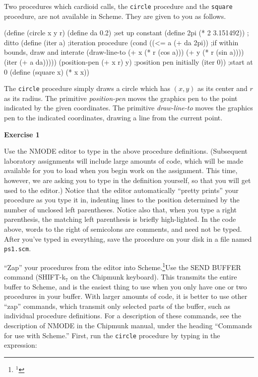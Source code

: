 Two procedures which cardioid calls, the {\tt circle} procedure and the
{\tt square} procedure, are not available in Scheme.  They are given to you as follows.

\beginlisp
(define (circle x y r)
  (define da 0.2)				;set up constant
  (define 2pi (* 2 3.151492))			; ditto
  (define (iter a)				;iteration procedure
    (cond ((<= a (+ da 2pi))			;if within bounds, draw and interate
           (draw-line-to (+ x (* r (cos a))) (+ y (* r (sin a))))
           (iter (+ a da)))))
  (position-pen (+ x r) y)			;position pen initially
  (iter 0))					;start at 0
\pbrk
(define (square x) (* x x))
\endlisp

The {\tt circle} procedure simply draws a circle which has $(x, y)$ as its
center and $r$ as its radius.  
The primitive {\it position-pen}
moves the graphics pen to the point indicated by the given
coordinates.  The primitive {\it draw-line-to} moves the graphics pen to
the indicated coordinates, drawing a line from the current point.

{\bf Exercise 1}

Use the NMODE editor to type in the above procedure definitions.  (Subsequent
laboratory assignments will include large amounts of code, which will be made
available for you to load when you begin work on the assignment.  This time,
however, we are asking you to type in the definition yourself, so that you 
will get used to the editor.)  Notice that the editor automatically ``pretty 
prints'' your procedure as you type it in, indenting lines to the position
determined by the number of unclosed left parentheses.  Notice also
that, when you type a right parenthesis, the matching left parenthesis
is briefly high-lighted.
In the code above, words to the right of semicolons are
comments, and need not be typed.  After you've typed in everything, save the
procedure on your disk in a file named {\tt ps1.scm}. 

``Zap'' your procedures from the editor into Scheme.\footnote{$^1$}{Use
the SEND BUFFER command (SHIFT-k$_7$ on the Chipmunk keyboard).
This transmits the entire buffer to Scheme, and is the easiest thing
to use when you only have one or two procedures in your buffer.  With
larger amounts of code, it is better to use other ``zap'' commands,
which transmit only selected parts of the buffer, such as individual
procedure definitions.  For a description of these commands, see the
description of NMODE in the Chipmunk manual, under the heading
``Commands for use with Scheme.''}
First, run the {\tt circle}
procedure by typing in the expression:

